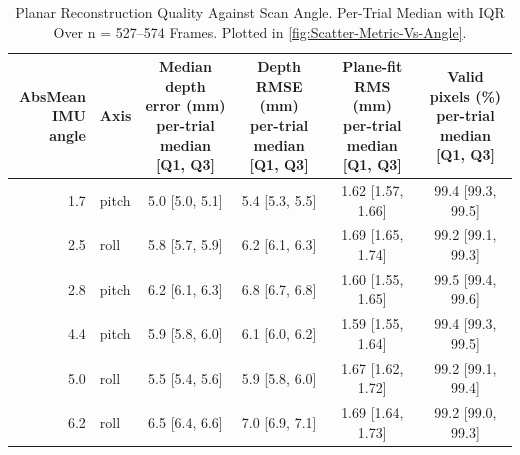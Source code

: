 \begin{table}[H]
	\centering
	\footnotesize
	\setlength{\tabcolsep}{4pt}
	\caption{Planar Reconstruction Quality Against Scan Angle. Per-Trial Median with IQR Over n = 527--574 Frames. Plotted in \autoref{fig:Scatter-Metric-Vs-Angle}.}
	\label{tab:Scatter_Metric_Vs_Angle}
	\begin{tabular}{r l *{4}{c}}
		\toprule
		\makecell{AbsMean\\IMU angle} & Axis & \makecell{Median depth\\error (mm)\\{\scriptsize per-trial median}\\{\scriptsize [Q1, Q3]}} & \makecell{Depth\\RMSE (mm)\\{\scriptsize per-trial median}\\{\scriptsize [Q1, Q3]}} & \makecell{Plane-fit\\RMS (mm)\\{\scriptsize per-trial median}\\{\scriptsize [Q1, Q3]}} & \makecell{Valid\\pixels (\%)\\{\scriptsize per-trial median}\\{\scriptsize [Q1, Q3]}} \\
		\midrule
		1.7 & pitch & 5.0 [5.0, 5.1] & 5.4 [5.3, 5.5] & 1.62 [1.57, 1.66] & 99.4 [99.3, 99.5] \\
		2.5 & roll & 5.8 [5.7, 5.9] & 6.2 [6.1, 6.3] & 1.69 [1.65, 1.74] & 99.2 [99.1, 99.3] \\
		2.8 & pitch & 6.2 [6.1, 6.3] & 6.8 [6.7, 6.8] & 1.60 [1.55, 1.65] & 99.5 [99.4, 99.6] \\
		4.4 & pitch & 5.9 [5.8, 6.0] & 6.1 [6.0, 6.2] & 1.59 [1.55, 1.64] & 99.4 [99.3, 99.5] \\
		5.0 & roll & 5.5 [5.4, 5.6] & 5.9 [5.8, 6.0] & 1.67 [1.62, 1.72] & 99.2 [99.1, 99.4] \\
		6.2 & roll & 6.5 [6.4, 6.6] & 7.0 [6.9, 7.1] & 1.69 [1.64, 1.73] & 99.2 [99.0, 99.3] \\

\end{tabular}
\end{table}
